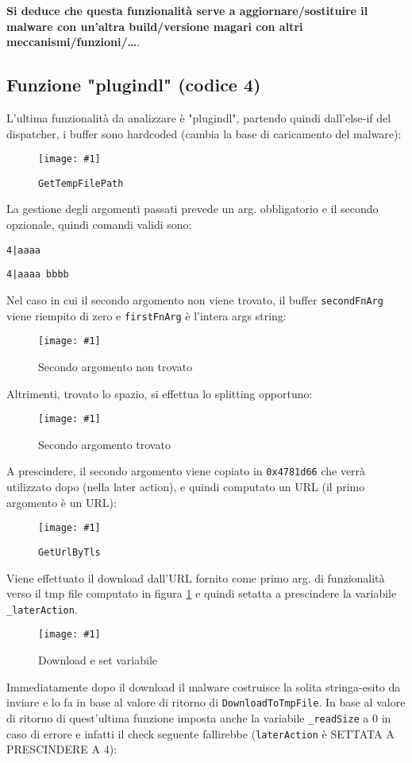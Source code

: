 \documentclass[
    a4paper, %
    11pt %
]{article}
\newcommand{\pic}[4]{\begin{figure}[H]
            \centering
            \texttt{[image: \#1]}
            \caption{#2}
            \label{fig:#1}
            \end{figure}}
\begin{document}
            \textbf{Si deduce che questa funzionalità serve a aggiornare/sostituire il malware con un'altra build/versione
            magari con altri meccanismi/funzioni/\dots}.

            \subsection{Funzione "plugindl" (codice 4)}

            L'ultima funzionalità da analizzare è "plugindl", partendo quindi dall'else-if del
            dispatcher, i buffer sono hardcoded (cambia la base di caricamento del malware):

            \pic{adv_4_gettmp}{\texttt{GetTempFilePath}}{16cm}{3.5cm}

            La gestione degli argomenti passati prevede un arg. obbligatorio e il secondo opzionale,
            quindi comandi validi sono:

            \begin{center}
                \texttt{4|aaaa}
                
                \texttt{4|aaaa bbbb}
            \end{center}

            Nel caso in cui il secondo argomento non viene trovato, il buffer \texttt{secondFnArg} viene riempito di zero
            e \texttt{firstFnArg} è l'intera args string:

            \pic{adv_4_notok}{Secondo argomento non trovato}{17cm}{8cm}

            Altrimenti, trovato lo spazio, si effettua lo splitting opportuno:

            \pic{adv_4_tok}{Secondo argomento trovato}{15cm}{8cm}

            A prescindere, il secondo argomento viene copiato in \texttt{0x4781d66} che verrà utilizzato
            dopo (nella later action), e quindi computato un URL (il primo argomento è un URL):
            \pic{adv_4_cpy_geturl}{\texttt{GetUrlByTls}}{13cm}{4cm}

            Viene effettuato il download dall'URL fornito come primo arg. di funzionalità verso il tmp file
            computato in figura \ref{fig:adv_4_gettmp} e quindi setatta a prescindere la variabile 
            \texttt{\_laterAction}.
            \pic{adv_4_dltmp}{Download e set variabile}{14cm}{2cm}

            Immediatamente dopo il download il malware costruisce la solita stringa-esito da inviare e lo fa in
            base al valore di ritorno di \texttt{DownloadToTmpFile}. In base al valore di ritorno di quest'ultima
            funzione imposta anche la variabile \texttt{\_readSize} a 0 in caso di errore e infatti
            il check seguente fallirebbe (\texttt{laterAction} è SETTATA A PRESCINDERE A 4):
            
\end{document}
